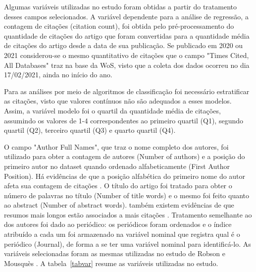 \documentclass[runningheads]{llncs}
\begin{document}
Algumas variáveis utilizadas no estudo foram obtidas a partir do tratamento desses campos selecionados. A variável dependente para a análise de regressão, a contagem de citações (citation count), foi obtida pelo pré-processamento do quantidade de citações do artigo que foram convertidas para a quantidade média de citações do artigo desde a data de sua publicação. Se publicado em 2020 ou 2021 considerou-se o mesmo quantitativo de citações que o campo "Times Cited, All Databases" traz na base da WoS, visto que a coleta dos dados ocorreu no dia 17/02/2021, ainda no início do ano.

Para as análises por meio de algoritmos de classificação foi necessário estratificar as citações, visto que valores contínuos não são adequados a esses modelos. Assim, a variável modelo foi o quartil da quantidade média de citações, assumindo os valores de 1-4 correspondentes ao primeiro quartil (Q1), segundo quartil (Q2), terceiro quartil (Q3) e quarto quartil (Q4).

O campo "Author Full Names", que traz o nome completo dos autores, foi utilizado para obter a contagem de autores (Number of authors) e a posição do primeiro autor no dataset quando ordenado alfabeticamente (First Author Position). Há evidências de que a posição alfabética do primeiro nome do autor afeta sua contagem de citações \cite{Tregenza1997}. O título do artigo foi tratado para obter o número de palavras no título (Number of title words) e o mesmo foi feito quanto ao abstract (Number of abstract words). também existem evidências de que resumos mais longos estão associados a mais citações \cite{Didegah2013}. Tratamento semelhante ao dos autores foi dado ao periódico: os periódicos foram ordenados e o índice atribuído a cada um foi armazenado na variável nominal que registra qual é o periódico (Journal), de forma a se ter uma variável nominal para identificá-lo. As variáveis selecionadas foram as mesmas utilizadas no estudo de Robson e Mousquès \cite{Robson2016}.  A tabela~\ref{tabvar}  resume as variáveis utilizadas no estudo.
                           
\end{document}

